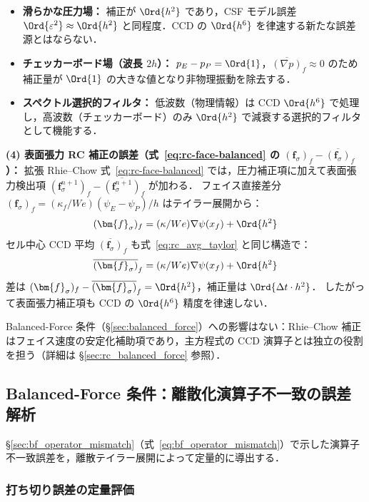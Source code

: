 \begin{itemize}
  \item \textbf{滑らかな圧力場：} 補正が $\Ord{h^2}$ であり，CSF モデル誤差 $\Ord{\varepsilon^2} \approx \Ord{h^2}$ と同程度．CCD の $\Ord{h^6}$ を律速する新たな誤差源とはならない．
  \item \textbf{チェッカーボード場（波長 $2h$）：} $p_E - p_P = \Ord{1}$，$\overline{(\nabla p)}_f \approx 0$ のため補正量が $\Ord{1}$ の大きな値となり非物理振動を除去する．
  \item \textbf{スペクトル選択的フィルタ：} 低波数（物理情報）は CCD $\Ord{h^6}$ で処理し，高波数（チェッカーボード）のみ $\Ord{h^2}$ で減衰する選択的フィルタとして機能する．
\end{itemize}

\textbf{(4) 表面張力 RC 補正の誤差（式~\eqref{eq:rc-face-balanced} の $(\bm{f}_\sigma)_f - \overline{(\bm{f}_\sigma)}_f$）：}
拡張 Rhie--Chow 式~\eqref{eq:rc-face-balanced} では，圧力補正項に加えて表面張力検出項
$(\bm{f}_\sigma^{n+1})_f - \overline{(\bm{f}_\sigma^{n+1})}_f$ が加わる．
フェイス直接差分 $(\bm{f}_\sigma)_f = (\kappa_f/We)(\psi_E-\psi_P)/h$ はテイラー展開から：
\[
  (\bm{f}_\sigma)_f = (\kappa/We)\nabla\psi(x_f) + \Ord{h^2}
\]
セル中心 CCD 平均 $\overline{(\bm{f}_\sigma)}_f$ も式~\eqref{eq:rc_avg_taylor} と同じ構造で：
\[
  \overline{(\bm{f}_\sigma)}_f = (\kappa/We)\nabla\psi(x_f) + \Ord{h^2}
\]
差は $(\bm{f}_\sigma)_f - \overline{(\bm{f}_\sigma)}_f = \Ord{h^2}$，補正量は $\Ord{\Delta t \cdot h^2}$．
したがって表面張力補正項も CCD の $\Ord{h^6}$ 精度を律速しない．

Balanced-Force 条件（§\ref{sec:balanced_force}）への影響はない：Rhie--Chow 補正はフェイス速度の安定化補助項であり，主方程式の CCD 演算子とは独立の役割を担う（詳細は §\ref{sec:rc_balanced_force} 参照）．

\subsection{Balanced-Force 条件：離散化演算子不一致の誤差解析}
\label{app:balanced_force_taylor}

§\ref{sec:bf_operator_mismatch}（式~\eqref{eq:bf_operator_mismatch}）で示した演算子不一致誤差を，離散テイラー展開によって定量的に導出する．

\subsubsection{打ち切り誤差の定量評価}

